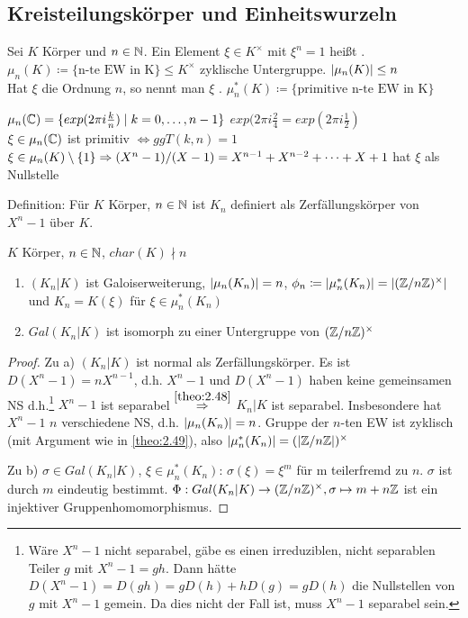 \documentclass[../main.tex]{subfiles}
\begin{document}
\subsection{Kreisteilungskörper und Einheitswurzeln}
\begin{definition}
    Sei $K$ Körper und $n\in \mathbb{N}$.
    Ein Element $\xi\in K^\times$ mit $\xi^n=1$ heißt .
    $\mu_n(K)\coloneqq\{\text{n-te EW in K}\}\leq K^\times$ zyklische Untergruppe.
    $\left\vert \mu_n(K) \right\vert\leq n$\\
    Hat $\xi$ die Ordnung $n$, so nennt man $\xi$ .
    $\mu_n^*(K) \coloneqq \{\text{primitive n-te EW in K}\}$
\end{definition}
\begin{example*}
    $\mu_n(\mathbb{C}) = \{exp(2\pi i\frac{k}{n})\mid k=0,\dots,n-1\}$
    $exp(2\pi i \frac{2}{4} = exp(2\pi i \frac{1}{2})$\\
    $\xi\in \mu_n(\mathbb{C})$ ist primitiv $\Leftrightarrow ggT(k,n)=1$\\
    $\xi\in \mu_n(K)\setminus\{1\} \Rightarrow (X^n-1)/(X-1) = X^{n-1}+X^{n-2}+\dots+X+1$ hat $\xi$ als Nullstelle
    \TODO[bild]
\end{example*}
Definition:
Für $K$ Körper, $n\in \mathbb{N}$ ist
$K_n$ definiert als Zerfällungskörper von $X^n-1$ über $K$.
\begin{theorem}\label{theo:3.10}
    $K$ Körper, $n\in \mathbb{N}$, $char(K)\nmid n$
    \begin{enumerate}[label=\alph*)]
        \item $(K_n|K)$ ist Galoiserweiterung, $\left\vert \mu_n(K_n) \right\vert=n$, $\phi_n\coloneqq \left\vert \mu_n^*(K_n) \right\vert= \left\vert (\mathbb{Z}/n\mathbb{Z})^\times \right\vert$ und
        $K_n = K(\xi)$ für $\xi \in \mu_n^*(K_n)$
        \item $Gal(K_n|K)$ ist isomorph zu einer Untergruppe von $(\mathbb{Z}/n\mathbb{Z})^\times$
    \end{enumerate}
\end{theorem}
\begin{proof}
    Zu a)
    $(K_n|K)$ ist normal als Zerfällungskörper.
    Es ist $D(X^n-1) = nX^{n-1}$, d.h. $X^n-1$ und $D(X^n-1)$ haben keine gemeinsamen NS d.h.\footnote{Wäre $X^n-1$ nicht separabel, gäbe es einen irreduziblen, nicht separablen Teiler $g$ mit $X^n-1=gh$. Dann hätte $D(X^n-1) = D(gh) = gD(h) + h D(g)= g D(h)$ die Nullstellen von $g$ mit $X^n-1$ gemein. Da dies nicht der Fall ist, muss $X^n-1$ separabel sein.} $X^n-1$ ist separabel $\overset{\ref{theo:2.48}}{\Rightarrow}$ $K_n|K$ ist separabel.
    Insbesondere hat $X^n-1$ $n$ verschiedene NS, d.h. $\left\vert \mu_n(K_n) \right\vert = n$.
    Gruppe der $n$-ten EW ist zyklisch (mit Argument wie in \ref{theo:2.49}), also $\left\vert \mu_n^*(K_n) \right\vert = (\left\vert \mathbb{Z}/n\mathbb{Z} \right\vert)^\times$

    Zu b)
    $\sigma \in Gal(K_n|K)$, $\xi \in \mu_n^*(K_n)$:
    $\sigma(\xi) = \xi^m$ für m teilerfremd zu $n$.
    $\sigma$ ist durch $m$ eindeutig bestimmt.
    $\Phi: Gal(K_n|K) \rightarrow (\mathbb{Z}/n\mathbb{Z})^\times, \sigma \mapsto m+n\mathbb{Z}$ ist ein injektiver Gruppenhomomorphismus.
\end{proof}
\end{document}

